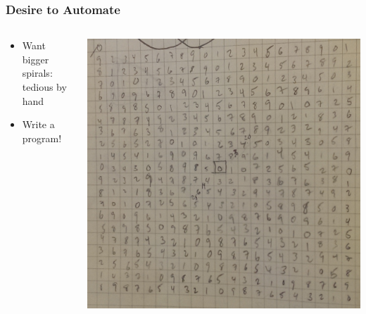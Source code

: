\documentclass{beamer}
\theoremstyle{mydef}
\begin{document}
\frame
{
  \frametitle{Desire to Automate}

  \begin{columns}
    \begin{column}{.5\textwidth}
     \begin{block}{
     
     \color{black}
  \begin{itemize}
       \color{black}

  \item Want bigger spirals: tedious by hand
  \item Write a program!
    \end{itemize} 
}
    \end{block}
    \end{column}
    \begin{column}{.5\textwidth}
    \begin{block}{}
\includegraphics[scale=.15]{images/bigmod10.png}
    \end{block}
    \end{column}
  \end{columns}
  }
\end{document}
